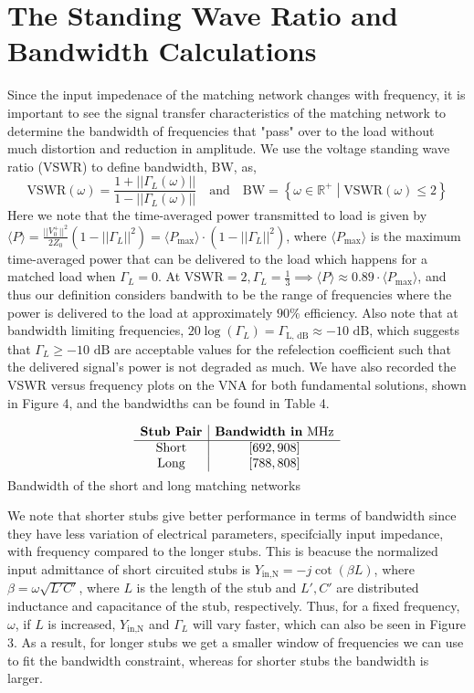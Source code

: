 \documentclass[10pt]{article}
\begin{document}
\section{The Standing Wave Ratio and Bandwidth Calculations}

Since the input impedenace of the matching network changes with frequency, it is important to see the signal transfer
characteristics of the matching network to determine the bandwidth of frequencies that "pass" over to the load without 
much distortion and reduction in amplitude. We use the voltage standing wave ratio ($\text{VSWR}$) to define bandwidth, 
$\text{BW}$, as,
\[
  \text{VSWR}(\omega) = \frac{1+||\Gamma_L(\omega)||}{1-||\Gamma_L(\omega)||} \quad \text{and} \quad \text{BW} = 
  \left\{\omega \in \mathbb{R}^{+} \middle | \text{VSWR}(\omega) \leq 2\right\}
\]
Here we note that the time-averaged power transmitted to load is given by $\langle P \rangle = \frac{||V_0^+||^2}{2Z_0}(1-||\Gamma_L||^2) = \langle P_\text{max} \rangle\cdot(1-||\Gamma_L||^2)$,
where $\langle P_\text{max}\rangle$ is the maximum time-averaged power that can be delivered to the load which happens for a matched load when $\Gamma_L = 0$.
At $\text{VSWR} = 2, \Gamma_L = \frac{1}{3} \implies \langle P \rangle \approx 0.89\cdot \langle P_\text{max}\rangle$, and thus our definition considers 
bandwith to be the range of frequencies where the power is delivered to the load at approximately $90\%$ efficiency. Also note 
that at bandwidth limiting frequencies, $20\log(\Gamma_L) = \Gamma_\text{L, dB} \approx -10\text{ dB}$, which suggests that 
$\Gamma_L \geq -10\text{ dB}$ are acceptable values for the refelection coefficient such that the delivered signal's power is not 
degraded as much. We have also recorded the VSWR versus frequency plots on the VNA for both fundamental solutions, shown in Figure 4, and the 
bandwidths can be found in Table 4.

\begin{table}[h]
  \[
    \begin{array}{c|c}
        \textbf{Stub Pair} & \textbf{Bandwidth in} \text{ MHz}\\ \hline
        \text{Short} &  [692, 908]\\
        \text{Long} & [788, 808]\vspace{-0.25cm}
    \end{array}
\]
\caption{Bandwidth of the short and long matching networks}
\end{table}

We note that shorter stubs give better performance in terms of bandwidth since they have less variation of electrical parameters,
specifcially input impedance, with frequency compared to the longer stubs. This is beacuse the normalized input admittance of short circuited
stubs is $Y_\text{in,N}=-j\cot(\beta L)$, where $\beta = \omega\sqrt{L'C'}$, where $L$ is the length of the stub and $L',C'$ are 
distributed inductance and capacitance of the stub, respectively. Thus, for a fixed frequency, $\omega$, if $L$ is increased, $Y_\text{in,N}$
and $\Gamma_L$ will vary faster, which can also be seen in Figure 3. As a result, for longer stubs we get a smaller window 
of frequencies we can use to fit the bandwidth constraint, whereas for shorter stubs the bandwidth is larger.
\end{document}
